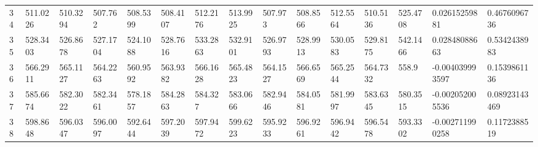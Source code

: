 \begin{landscape}
{\begin{longtable}{@{}lllllllllllllll@{}}
		34                                           & 511.0226                 & 510.3294                 & 507.762                  & 508.5399                 & 508.4107                 & 512.2176                 & 513.9925                 & 507.973                  & 508.8566                 & 512.5564                 & 510.5136                 & 525.4708                 & 0.02615259881                                                          & 0.4676096736                                    \\
		35                                           & 528.3403                 & 526.8678                 & 527.1704                 & 524.1088                 & 528.7616                 & 533.2863                 & 532.9101                 & 526.9793                 & 528.9913                 & 530.0583                 & 529.8175                 & 542.1466                 & 0.02848088663                                                          & 0.5342438983                                    \\
		36                                           & 566.2911                 & 565.1127                 & 564.2263                 & 560.9592                 & 563.9382                 & 566.1628                 & 565.4823                 & 564.1527                 & 566.6569                 & 565.2544                 & 564.7332                 & 558.9                    & -0.004039993597                                                        & 0.1539861136                                    \\
		37                                           & 585.6674                 & 582.3022                 & 582.3461                 & 578.1857                 & 584.2863                 & 584.327                  & 583.0666                 & 582.9446                 & 584.0581                 & 581.9997                 & 583.6345                 & 580.3515                 & -0.002052005536                                                        & 0.08923143469                                   \\
		38                                           & 598.8648                 & 596.0347                 & 596.0097                 & 592.6444                 & 597.2039                 & 597.9472                 & 599.6223                 & 595.9233                 & 596.9261                 & 596.9442                 & 596.5478                 & 593.3302                 & -0.002711990258                                                        & 0.1172388519                                    \\

\end{longtable}}
\end{landscape}
